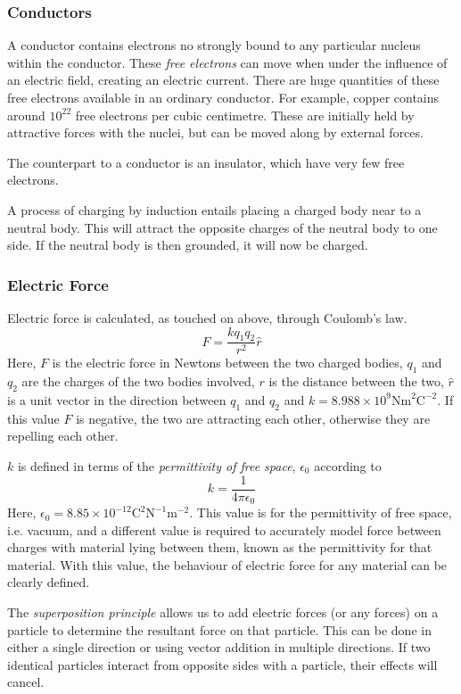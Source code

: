 \documentclass[12pt]{report}
\begin{document}
\begin{flushleft}
\subsubsection*{Conductors}
A conductor contains electrons no strongly bound to any particular nucleus 
within the conductor. These \textit{free electrons} can move when under the
influence of an electric field, creating an electric current. There are huge
quantities of these free electrons available in an ordinary conductor. For
example, copper contains around \(10^{22}\) free electrons per cubic 
centimetre. These are initially held by attractive forces with the nuclei, but
can be moved along by external forces.

\bigskip
The counterpart to a conductor is an insulator, which have very few free 
electrons.

\bigskip
A process of charging by induction entails placing a charged body near to a
neutral body. This will attract the opposite charges of the neutral body to one
side. If the neutral body is then grounded, it will now be charged.

\subsubsection*{Electric Force}
Electric force is calculated, as touched on above, through Coulomb's law.
\[F = \frac{kq_1q_2}{r^2}\hat{r}\]
Here, \(F\) is the electric force in Newtons between the two charged bodies,
\(q_1\) and \(q_2\) are the charges of the two bodies involved, \(r\) is the
distance between the two, \(\hat{r}\) is a unit vector in the direction
between \(q_1\) and \(q_2\) and 
\(k = 8.988\times10^9\mathrm{Nm}^2\mathrm{C}^{-2}\). If this value \(F\) is
negative, the two are attracting each other, otherwise they are repelling each
other.

\bigskip
\(k\) is defined in terms of the \textit{permittivity of free space}, 
\(\epsilon_0\) according to
\[k = \frac{1}{4\pi\epsilon_0}\]
Here, \(\epsilon_0 = 8.85\times10^{-12}\mathrm{C^2N^{-1}m^{-2}}\). This value
is for the permittivity of free space, i.e. vacuum, and a different value is
required to accurately model force between charges with material lying between
them, known as the permittivity for that material. With this value, the 
behaviour of electric force for any material can be clearly defined.

\bigskip
The \textit{superposition principle} allows us to add electric forces (or any
forces) on a particle to determine the resultant force on that particle. This
can be done in either a single direction or using vector addition in multiple
directions. If two identical particles interact from opposite sides with a
particle, their effects will cancel.


\end{flushleft}
\end{document}
